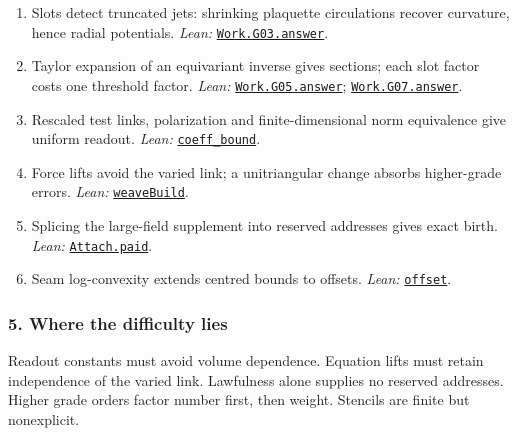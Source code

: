 \documentclass[
  letterpaper,
  11pt]{article}
\newcounter{none} %
\providecommand{\tightlist}{%
  \setlength{\itemsep}{0pt}\setlength{\parskip}{0pt}}
\begin{document}
\begin{enumerate}
\def\labelenumi{\arabic{enumi}.}
\tightlist
\item
  Slots detect truncated jets: shrinking plaquette circulations recover
  curvature, hence radial potentials. \emph{Lean:}
  \href{https://github.com/yang-mills-group/OpenAI-YM-20261028/blob/3456e5e75cf8d4cd558955a5c7638fba2d68f464/YM/Work/G03.lean\#L212-L224}{\texttt{Work.G03.answer}}.
\item
  Taylor expansion of an equivariant inverse gives sections; each slot
  factor costs one threshold factor. \emph{Lean:}
  \href{https://github.com/yang-mills-group/OpenAI-YM-20261028/blob/3456e5e75cf8d4cd558955a5c7638fba2d68f464/YM/Work/G05.lean\#L113-L139}{\texttt{Work.G05.answer}};
  \href{https://github.com/yang-mills-group/OpenAI-YM-20261028/blob/3456e5e75cf8d4cd558955a5c7638fba2d68f464/YM/Work/G07.lean\#L79-L102}{\texttt{Work.G07.answer}}.
\item
  Rescaled test links, polarization and finite-dimensional norm
  equivalence give uniform readout. \emph{Lean:}
  \href{https://github.com/yang-mills-group/OpenAI-YM-20261028/blob/3456e5e75cf8d4cd558955a5c7638fba2d68f464/YM/Next/FOUNDATIONS/TestBounds.lean\#L234-L265}{\texttt{coeff\_bound}}.
\item
  Force lifts avoid the varied link; a unitriangular change absorbs
  higher-grade errors. \emph{Lean:}
  \href{https://github.com/yang-mills-group/OpenAI-YM-20261028/blob/3456e5e75cf8d4cd558955a5c7638fba2d68f464/YM/Push/RELAY_MARK/Portfolio.lean\#L60-L97}{\texttt{weaveBuild}}.
\item
  Splicing the large-field supplement into reserved addresses gives
  exact birth. \emph{Lean:}
  \href{https://github.com/yang-mills-group/OpenAI-YM-20261028/blob/3456e5e75cf8d4cd558955a5c7638fba2d68f464/YM/Extra/SOURCE_HISTORIES/Purchase.lean\#L42-L78}{\texttt{Attach.paid}}.
\item
  Seam log-convexity extends centred bounds to offsets. \emph{Lean:}
  \href{https://github.com/yang-mills-group/OpenAI-YM-20261028/blob/3456e5e75cf8d4cd558955a5c7638fba2d68f464/YM/Push/RELAY_DIFFERENCE/Placement.lean\#L232-L270}{\texttt{offset}}.
\end{enumerate}

\subsubsection{5. Where the difficulty
lies}\label{where-the-difficulty-lies-1}

Readout constants must avoid volume dependence. Equation lifts must
retain independence of the varied link. Lawfulness alone supplies no
reserved addresses. Higher grade orders factor number first, then
weight. Stencils are finite but nonexplicit.
\end{document}
